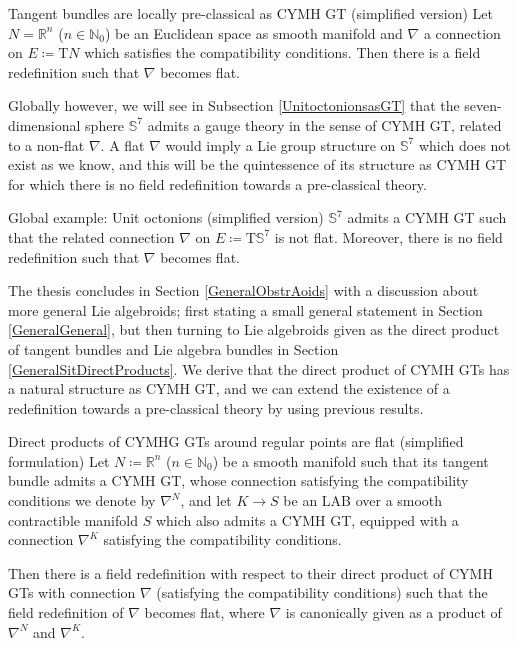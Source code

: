 \begin{theorems*}{Tangent bundles are locally pre-classical as CYMH GT (simplified version)}
Let $N = \mathbb{R}^n$ ($n \in \mathbb{N}_0$) be an Euclidean space as smooth manifold and $\nabla$ a connection on $E \coloneqq \mathrm{T}N$ which satisfies the compatibility conditions. Then there is a field redefinition such that $\nabla$ becomes flat.
\end{theorems*}

Globally however, we will see in Subsection \ref{UnitoctonionsasGT} that the seven-dimensional sphere $\mathds{S}^7$ admits a gauge theory in the sense of CYMH GT, related to a non-flat $\nabla$. A flat $\nabla$ would imply a Lie group structure on $\mathds{S}^7$ which does not exist as we know, and this will be the quintessence of its structure as CYMH GT for which there is no field redefinition towards a pre-classical theory.

\begin{theorems*}{Global example: Unit octonions (simplified version)}
$\mathbb{S}^7$ admits a CYMH GT such that the related connection $\nabla$ on $E \coloneqq \mathrm{T}\mathds{S}^7$ is not flat. Moreover, there is no field redefinition such that $\nabla$ becomes flat.
\end{theorems*}

The thesis concludes in Section \ref{GeneralObstrAoids} with a discussion about more general Lie algebroids; first stating a small general statement in Section \ref{GeneralGeneral}, but then turning to Lie algebroids given as the direct product of tangent bundles and Lie algebra bundles in Section \ref{GeneralSitDirectProducts}. We derive that the direct product of CYMH GTs has a natural structure as CYMH GT, and we can extend the existence of a redefinition towards a pre-classical theory by using previous results.

\begin{theorems*}{Direct products of CYMHG GTs around regular points are flat (simplified formulation)}
Let $N \coloneqq \mathbb{R}^n$ ($n \in \mathbb{N}_0$) be a smooth manifold such that its tangent bundle admits a CYMH GT, whose connection satisfying the compatibility conditions we denote by $\nabla^{N}$, and let $K \to S$ be an LAB over a smooth contractible manifold $S$ which also admits a CYMH GT, equipped with a connection $\nabla^K$ satisfying the compatibility conditions.

Then there is a field redefinition with respect to their direct product of CYMH GTs with connection $\nabla$ (satisfying the compatibility conditions) such that the field redefinition of $\nabla$ becomes flat, where $\nabla$ is canonically given as a product of $\nabla^N$ and $\nabla^K$.
\end{theorems*}

